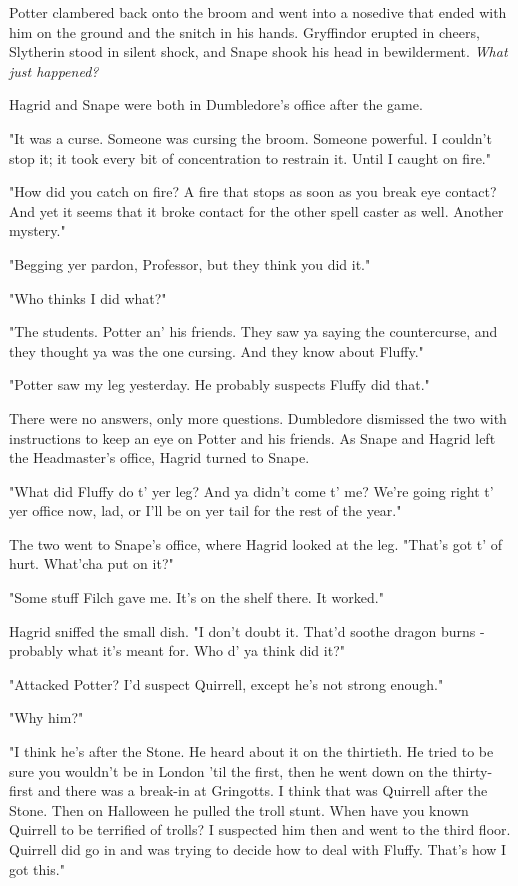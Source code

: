 Potter clambered back onto the broom and went into a nosedive that ended with him on the ground and the snitch in his hands. Gryffindor erupted in cheers, Slytherin stood in silent shock, and Snape shook his head in bewilderment. \emph{What just happened?}

Hagrid and Snape were both in Dumbledore's office after the game.

"It was a curse. Someone was cursing the broom. Someone powerful. I couldn't stop it; it took every bit of concentration to restrain it. Until I caught on fire."

"How did you catch on fire? A fire that stops as soon as you break eye contact? And yet it seems that it broke contact for the other spell caster as well. Another mystery."

"Begging yer pardon, Professor, but they think you did it."

"Who thinks I did what?"

"The students. Potter an' his friends. They saw ya saying the countercurse, and they thought ya was the one cursing. And they know about Fluffy."

"Potter saw my leg yesterday. He probably suspects Fluffy did that."

There were no answers, only more questions. Dumbledore dismissed the two with instructions to keep an eye on Potter and his friends. As Snape and Hagrid left the Headmaster's office, Hagrid turned to Snape.

"What did Fluffy do t' yer leg? And ya didn't come t' me? We're going right t' yer office now, lad, or I'll be on yer tail for the rest of the year."

The two went to Snape's office, where Hagrid looked at the leg. "That's got t' of hurt. What'cha put on it?"

"Some stuff Filch gave me. It's on the shelf there. It worked."

Hagrid sniffed the small dish. "I don't doubt it. That'd soothe dragon burns - probably what it's meant for. Who d' ya think did it?"

"Attacked Potter? I'd suspect Quirrell, except he's not strong enough."

"Why him?"

"I think he's after the Stone. He heard about it on the thirtieth. He tried to be sure you wouldn't be in London 'til the first, then he went down on the thirty-first and there was a break-in at Gringotts. I think that was Quirrell after the Stone. Then on Halloween he pulled the troll stunt. When have you known Quirrell to be terrified of trolls? I suspected him then and went to the third floor. Quirrell did go in and was trying to decide how to deal with Fluffy. That's how I got this."

